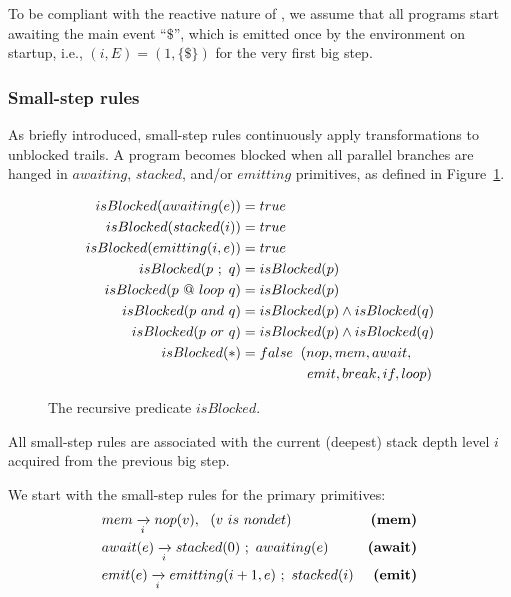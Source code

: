 To be compliant with the reactive nature of \CEU, we assume that all programs 
start awaiting the main event ``$\$$'', which is emitted once by the 
environment on startup, i.e., $(i,E)=(1,\{\$\})$ for the very first big step.

\subsubsection{Small-step rules}
\label{sec.sem.small}

As briefly introduced, small-step rules continuously apply transformations to 
unblocked trails.
A program becomes blocked when all parallel branches are hanged in $awaiting$, 
$stacked$, and/or $emitting$ primitives, as defined in 
Figure~\ref{fig:isBlocked}.


\begin{figure}[t]
{\small
\begin{align*}
  isBlocked(awaiting(e))   &= true                             \\
  isBlocked(stacked(i))    &= true                             \\
  isBlocked(emitting(i,e)) &= true                             \\
  isBlocked(p~;~q)         &= isBlocked(p)                     \\
  isBlocked(p~@~loop~q)    &= isBlocked(p)                     \\
  isBlocked(p~and~q)       &= isBlocked(p) \wedge isBlocked(q) \\
  isBlocked(p~or~q)        &= isBlocked(p) \wedge isBlocked(q) \\
  isBlocked(*)             &= false \2  (nop,mem,await,        \\
                           &    \5\5\5\2 emit,break,if,loop)   %
\end{align*}
}%
\caption{ The recursive predicate $isBlocked$.
\label{fig:isBlocked}
}
\end{figure}

All small-step rules are associated with the current (deepest) stack depth 
level $i$ acquired from the previous big step.

We start with the small-step rules for the primary primitives:
%
\begin{eqnarray*}
& mem \ST nop(v),~~(v~is~nondet)
    & \textbf{(mem)}        \\
& await(e) \ST stacked(0)~;~awaiting(e)
    & \textbf{(await)}      \\
& emit(e) \ST emitting(i+1,e)~;~stacked(i)
    & \textbf{(emit)}       %
\end{eqnarray*}

